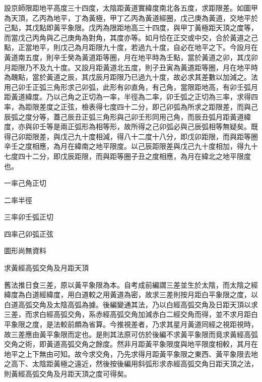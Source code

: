 \begin{pinyinscope}
設京師限距地平高度三十四度，太陰距黃道實緯度南北各五度，求距限差。如圖甲為天頂，乙丙為地平，丁為黃極，甲丁乙丙為黃道經圈，戊己庚為黃道，交地平於己點，其戊點即黃平象限。戊丙為限距地高三十四度，與甲丁黃極距天頂之度等，而當戊己丙角與乙己庚角為對角，其度亦等。如月恰在正交或中交，合於黃道之己點，正當地平，則戊己為月距限九十度，若過九十度，自必在地平之下。今設月在黃道南五度，則辛壬癸為黃道距等圈，月在地平時為壬點，當於黃道之卯，其戊卯月距限乃不及九十度。又設月距黃道北五度，則子丑寅為黃道距等圈，月在地平時為醜點，當於黃道之辰，其戊辰月距限乃已過九十度，故必求其差數以加減之。法用己卯壬正弧三角形求己卯弧，此形有卯直角，有己角，當限距地高，有卯壬弧月距黃道緯度。乃以己角之正切為一率，半徑為二率，卯壬弧之正切為三率，求得四率，為距限差度之正弦，檢表得七度四十二分，即己卯弧為所求之距限差，而與己辰弧之度分等，蓋己辰丑正弧三角形與己卯壬形同用己角，而辰丑弧月距黃道緯度，亦與卯壬等是兩正弧形為相等形，故所得之己卯弧必與己辰弧相等無疑矣。既得己卯距限差，與戊己九十度相減，得八十二度十八分，即戊卯距限，而與距等圈辛壬之度相應，為月在緯南之地平限度。以己辰距限差與戊己九十度相加，得九十七度四十二分，即戊辰距限，而與距等圈子丑之度相應，為月在緯北之地平限度也。

一率己角正切

二率半徑

三率卯壬弧正切

四率己卯弧正弦

圖形尚無資料

求黃經高弧交角及月距天頂

舊法推日食三差，原以黃平象限為本。自考成前編謂三差並生於太陰，而太陰之經緯度為白道經緯度，用白道較之用黃道為密，故求三差則按月距白平象限之度，以白道高弧交角及太陰高弧為據。後編變通其法，乃以白經高弧交角及日距天頂以求三差，而求白經高弧交角，系赤經高弧交角加減赤白二經交角而得，並不求月距白平象限之度，是法較前頗為省算。今推視差者，乃求其星月黃道同經之視距視時，故三差應由黃平象限而定也。是則其法原可仿於後編不求黃平象限而竟求黃經高弧交角之術，即黃道高弧交角之餘度。然非月距黃平象限度與地平限度相較，其月在地平之上下無由可知。故今求交角，乃先求得月距黃平象限之東西、黃平象限去地之高下、太陰距黃極之遠近，然後按後編用斜弧形求赤經高弧交角日距天頂之法，則黃經高弧交角及月距天頂之度可得矣。


\end{pinyinscope}
